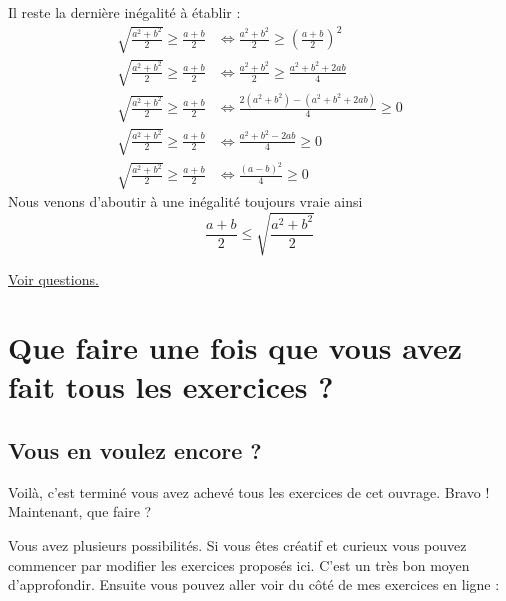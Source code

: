 \documentclass[11pt]{article}
\begin{document}
\begin{enumerate}
Il reste la dernière inégalité à établir : 
\begin{align*}
	\sqrt{\frac{a^2+b^2}{2}} \geq \frac{a+b}{2} &\iff \frac{a^2+b^2}{2} \geq \left(\frac{a+b}{2}\right)^2 \\
	\sqrt{\frac{a^2+b^2}{2}} \geq \frac{a+b}{2} &\iff \frac{a^2+b^2}{2} \geq \frac{a^2+b^2 + 2ab}{4} \\
	\sqrt{\frac{a^2+b^2}{2}} \geq \frac{a+b}{2} &\iff \frac{2(a^2+b^2) - (a^2+b^2 + 2ab)}{4} \geq 0 \\
	\sqrt{\frac{a^2+b^2}{2}} \geq \frac{a+b}{2} &\iff \frac{a^2 + b^2 - 2ab}{4} \geq 0 \\
	\sqrt{\frac{a^2+b^2}{2}} \geq \frac{a+b}{2} &\iff \frac{(a - b)^2}{4} \geq 0 
\end{align*}
Nous venons d'aboutir à une inégalité toujours vraie ainsi 
\[\boxed{\frac{a + b}{2}\leq \sqrt{\frac{a^2+b^2}{2}}}\]
\end{enumerate}




\hyperref[orgbff966e]{Voir questions.}

\newpage



\section{Que faire une fois que vous avez fait tous les exercices ?}
\label{sec:org03268ee}

\subsection{Vous en voulez encore ?}
\label{sec:org26043e4}

Voilà, c'est terminé vous avez achevé tous les exercices de cet
ouvrage. Bravo ! Maintenant, que faire ?


Vous avez plusieurs possibilités. Si vous êtes créatif et curieux vous
pouvez commencer par modifier les exercices proposés ici. C'est un
très bon moyen d'approfondir. Ensuite vous pouvez aller voir du côté
de mes exercices en ligne :
\end{document}
